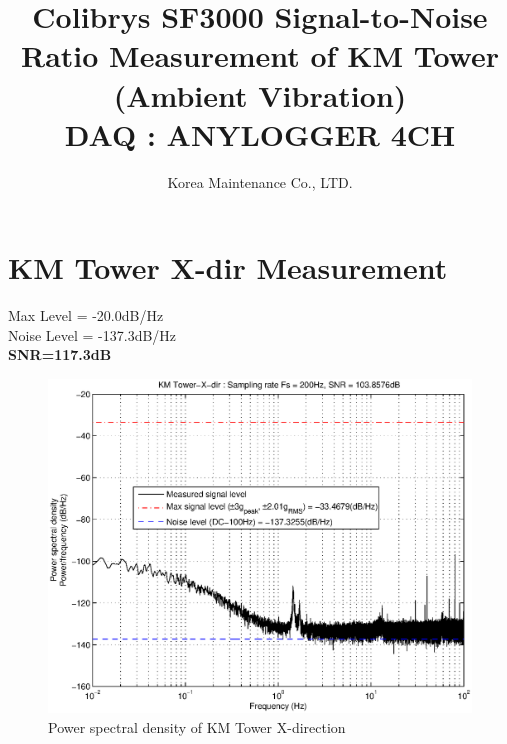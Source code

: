 \documentclass[11pt]{article} %
\title{Colibrys SF3000 Signal-to-Noise Ratio Measurement of KM Tower (Ambient Vibration)\\DAQ : ANYLOGGER 4CH}
\author{Korea Maintenance Co., LTD.}
\begin{document}
\maketitle
\clearpage
\section{KM Tower X-dir Measurement}
Max Level = -20.0dB/Hz\\
Noise Level = -137.3dB/Hz\\
\textbf{SNR=117.3dB}
\begin{figure}[!hbpt]
\centering
\includegraphics[keepaspectratio=true,width=1\linewidth]{figs/KMTower-X-dir.eps}
\caption{Power spectral density of KM Tower X-direction}
\label{fig:psd1}
\end{figure}

\clearpage
\end{document}
